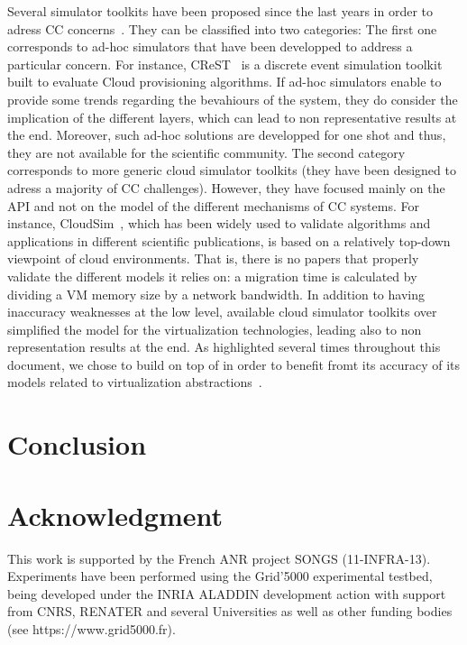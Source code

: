 Several simulator toolkits have been proposed since the last years in
order to adress CC concerns~\cite{CC13, DGSIM, cloudsim,
  icancloud, greencloud}.
They can be classified into two categories: The first one corresponds to ad-hoc simulators
that have been developped to address a particular concern. For
instance, CReST~\cite{CC13} is a discrete event simulation toolkit
built to evaluate Cloud provisioning algorithms. If ad-hoc simulators
enable to provide some trends regarding the bevahiours of the system,
they do consider the implication of the different layers, which can
lead to non representative results at the end. Moreover, such ad-hoc
solutions are developped for one shot and thus, they are not available
for the scientific community. The second category
\cite{icancloud, greencloud, cloudsim} corresponds to more generic cloud simulator
toolkits (\ie they have been designed to adress a majority
of CC challenges). However, they have focused mainly on
the API and not on the model of the different mechanisms of CC
systems.
For instance, CloudSim~\cite{cloudsim}, which has been widely used to validate
algorithms and applications in different scientific publications,
is based on a relatively top-down viewpoint of cloud environments.
That is,  there is no papers that properly validate the different models it
relies on: a migration time is calculated by dividing a VM memory size by a
network bandwidth.
 In addition to having inaccuracy weaknesses at the low level, available cloud
simulator toolkits over simplified the model for the virtualization
technologies, leading also to non representation results at the
end. As highlighted several times throughout this document, we chose to
build \vmps on top of \sg in order to benefit fromt its accuracy of
its models related to virtualization abstractions~\cite{Hirofuchi:2013:ALM:2568486.2568524}.

\section{Conclusion}
\label{sec:conclusion}





\section{Acknowledgment}
This work is supported by the French ANR project SONGS (11-INFRA-13).
Experiments have been performed using the Grid'5000
experimental testbed, being developed under the INRIA ALADDIN development
 action with support from CNRS, RENATER and several Universities as well as
 other funding bodies (see https://www.grid5000.fr).


